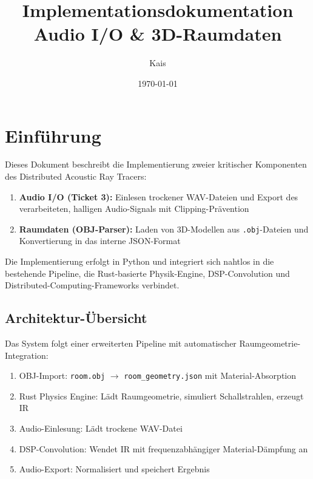 \documentclass[11pt,a4paper,twoside]{report}
\title{\Huge\textbf{Implementationsdokumentation}\\[0.3cm]
       \Large Audio I/O \& 3D-Raumdaten}
\author{Kais}
\date{\today}
\begin{document}
\maketitle
\tableofcontents
\newpage

\chapter{Einf\"uhrung}

Dieses Dokument beschreibt die Implementierung zweier kritischer Komponenten des Distributed Acoustic Ray Tracers:

\begin{enumerate}
    \item \textbf{Audio I/O (Ticket 3):} Einlesen trockener WAV-Dateien und Export des verarbeiteten, halligen Audio-Signals mit Clipping-Pr\"avention
    \item \textbf{Raumdaten (OBJ-Parser):} Laden von 3D-Modellen aus \texttt{.obj}-Dateien und Konvertierung in das interne JSON-Format
\end{enumerate}

Die Implementierung erfolgt in Python und integriert sich nahtlos in die bestehende Pipeline, die Rust-basierte Physik-Engine, DSP-Convolution und Distributed-Computing-Frameworks verbindet.

\section{Architektur-\"Ubersicht}

Das System folgt einer erweiterten Pipeline mit automatischer Raumgeometrie-Integration:

\begin{enumerate}
    \item[\textbf{[0/4]}] OBJ-Import: \texttt{room.obj} $\to$ \texttt{room\_geometry.json} mit Material-Absorption
    \item[\textbf{[1/4]}] Rust Physics Engine: L\"adt Raumgeometrie, simuliert Schallstrahlen, erzeugt IR
    \item[\textbf{[2/4]}] Audio-Einlesung: L\"adt trockene WAV-Datei
    \item[\textbf{[3/4]}] DSP-Convolution: Wendet IR mit frequenzabh\"angiger Material-D\"ampfung an
    \item[\textbf{[4/4]}] Audio-Export: Normalisiert und speichert Ergebnis
\end{enumerate}
\end{document}
